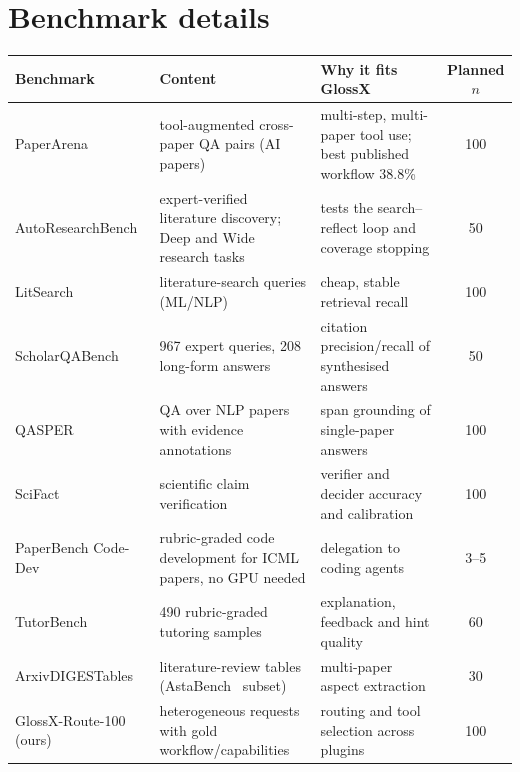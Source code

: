 \documentclass{article}
\newcommand{\sysname}{GlossX}
\begin{document}
\section{Benchmark details}
\label{app:bench}
\begin{table}[H]
  \centering
  \scriptsize
  \setlength{\tabcolsep}{3pt}
  \begin{tabularx}{\textwidth}{@{}>{\raggedright\arraybackslash}p{2.6cm}>{\raggedright\arraybackslash}p{3.6cm}>{\raggedright\arraybackslash}Xc@{}}
    \toprule
    \textbf{Benchmark} & \textbf{Content} & \textbf{Why it fits \sysname{}} & \textbf{Planned $n$} \\
    \midrule
    PaperArena~\cite{wang2025paperarena} & 784 tool-augmented cross-paper QA pairs (AI papers) & multi-step, multi-paper tool use; best published workflow 38.8\% & 100 \\
    AutoResearchBench~\cite{xiong2026autoresearchbench} & expert-verified literature discovery; Deep and Wide research tasks & tests the search--reflect loop and coverage stopping & 50 \\
    LitSearch~\cite{ajith2024litsearch} & 597 literature-search queries (ML/NLP) & cheap, stable retrieval recall & 100 \\
    ScholarQABench~\cite{asai2024openscholar} & 2{,}967 expert queries, 208 long-form answers & citation precision/recall of synthesised answers & 50 \\
    QASPER~\cite{dasigi2021qasper} & QA over NLP papers with evidence annotations & span grounding of single-paper answers & 100 \\
    SciFact~\cite{wadden2020scifact} & scientific claim verification & verifier and decider accuracy and calibration & 100 \\
    PaperBench Code-Dev~\cite{starace2025paperbench} & rubric-graded code development for ICML papers, no GPU needed & delegation to coding agents & 3--5 \\
    TutorBench~\cite{srinivasa2025tutorbench} & 1{,}490 rubric-graded tutoring samples & explanation, feedback and hint quality & 60 \\
    ArxivDIGESTables~\cite{newman2024arxivdigestables} & literature-review tables (AstaBench~\cite{bragg2025astabench} subset) & multi-paper aspect extraction & 30 \\
    \sysname{}-Route-100 (ours) & 100 heterogeneous requests with gold workflow/capabilities & routing and tool selection across plugins & 100 \\
    \bottomrule
  \end{tabularx}
\end{table}
\end{document}
